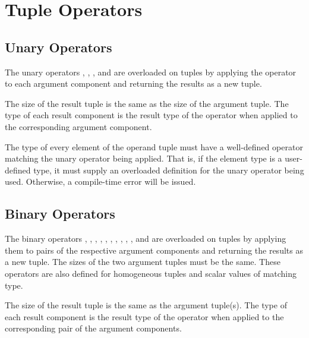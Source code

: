 \section{Tuple Operators}
\label{Tuple_Operators}

\subsection{Unary Operators}
\label{Tuple_Unary_Operators}

The unary operators \chpl{+}, \chpl{-}, \chpl{\~}, and \chpl{!} are
overloaded on tuples by applying the operator to each argument component
and returning the results as a new tuple.

The size of the result tuple is the same as the size of the
argument tuple. The type of each result component is the result
type of the operator when applied to the corresponding argument component.

The type of every element of the operand tuple must have a
well-defined operator matching the unary operator being applied.  That
is, if the element type is a user-defined type, it must supply an
overloaded definition for the unary operator being used.  Otherwise, a
compile-time error will be issued.

\subsection{Binary Operators}
\label{Tuple_Binary_Operators}

The binary operators \chpl{+}, \chpl{-}, \chpl{*}, \chpl{/}, \chpl{\%},
\chpl{**}, \chpl{\&}, \chpl{|}, \chpl{^}, \chpl{<<}, and \chpl{>>}
are overloaded on tuples by applying them to pairs of the respective
argument components and returning the results as a new tuple.  The
sizes of the two argument tuples must be the same.  These operators
are also defined for homogeneous tuples and scalar values of matching
type.

The size of the result tuple is the same as the argument tuple(s).
The type of each result component is the result type of the operator
when applied to the corresponding pair of the argument components.

